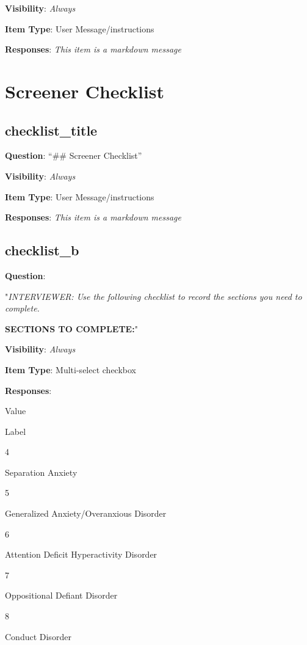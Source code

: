\documentclass[]{book}
\begin{document}
\textbf{Visibility}: \emph{Always}

\textbf{Item Type}: User Message/instructions

\textbf{Responses}: \emph{This item is a markdown message}

\hypertarget{screener_checklist}{%
\chapter{Screener Checklist}\label{screener_checklist}}

\hypertarget{checklist_title}{%
\section{checklist\_title}\label{checklist_title}}

\textbf{Question}: ``\#\# Screener Checklist''

\textbf{Visibility}: \emph{Always}

\textbf{Item Type}: User Message/instructions

\textbf{Responses}: \emph{This item is a markdown message}

\hypertarget{checklist_b}{%
\section{checklist\_b}\label{checklist_b}}

\textbf{Question}:

"\emph{INTERVIEWER: Use the following checklist to record the sections you need to complete. }

\textbf{SECTIONS TO COMPLETE:}"

\textbf{Visibility}: \emph{Always}

\textbf{Item Type}: Multi-select checkbox

\textbf{Responses}:

Value

Label

4

Separation Anxiety

5

Generalized Anxiety/Overanxious Disorder

6

Attention Deficit Hyperactivity Disorder

7

Oppositional Defiant Disorder

8

Conduct Disorder
\end{document}
